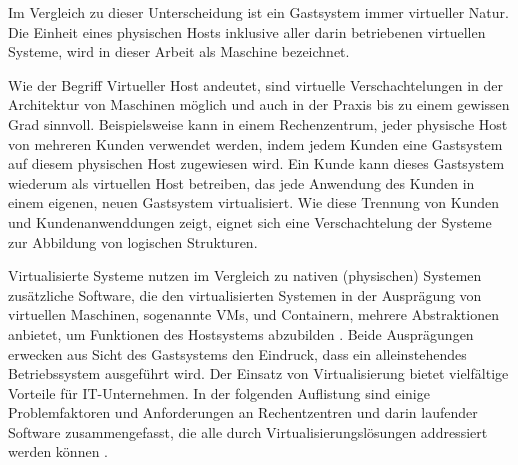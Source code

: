 \documentclass[../main.tex]{subfiles}
\begin{document}
		Im Vergleich zu dieser Unterscheidung ist ein Gastsystem immer virtueller Natur. Die Einheit eines physischen Hosts inklusive aller darin betriebenen virtuellen Systeme, wird in dieser Arbeit als Maschine bezeichnet.

		Wie der Begriff \glqq{}Virtueller Host\grqq{} andeutet, sind virtuelle Verschachtelungen in der Architektur von Maschinen möglich und auch in der Praxis bis zu einem gewissen Grad sinnvoll. Beispielsweise kann in einem Rechenzentrum, jeder physische Host von mehreren Kunden verwendet werden, indem jedem Kunden eine Gastsystem auf diesem physischen Host zugewiesen wird. Ein Kunde kann dieses Gastsystem wiederum als virtuellen Host betreiben, das jede Anwendung des Kunden in einem eigenen, neuen Gastsystem virtualisiert. Wie diese Trennung von Kunden und Kundenanwenddungen zeigt, eignet sich eine Verschachtelung der Systeme zur Abbildung von logischen Strukturen.


		Virtualisierte Systeme nutzen im Vergleich zu nativen (physischen) Systemen zusätzliche Software, die den virtualisierten Systemen in der Ausprägung von virtuellen Maschinen, sogenannte \acrshort{VM}s, und Containern, mehrere Abstraktionen anbietet, um Funktionen des Hostsystems abzubilden \cite[S.2]{containerVirtPerformance}. Beide Ausprägungen erwecken aus Sicht des Gastsystems den Eindruck, dass ein alleinstehendes Betriebssystem ausgeführt wird.
    Der Einsatz von Virtualisierung bietet vielfältige Vorteile für \acrshort{IT}-Unternehmen. In der folgenden Auflistung sind einige Problemfaktoren und Anforderungen an Rechentzentren und darin laufender Software zusammengefasst, die alle durch Virtualisierungslösungen addressiert werden können \cite[S.1]{bsiVirt}\cite[S.662,672f.]{tanenbaumOS}\cite[S.299]{mandlOS}.



\end{document}
